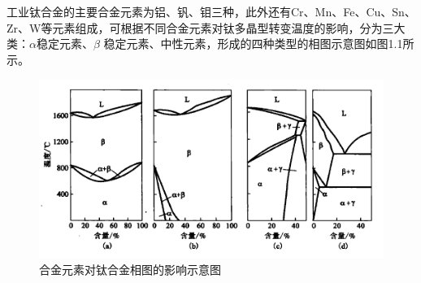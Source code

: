 工业钛合金的主要合金元素为铝、钒、钼三种，此外还有Cr、Mn、Fe、Cu、Sn、Zr、W等元素组成，可根据不同合金元素对钛多晶型转变温度的影响，分为三大类：$\alpha$稳定元素、$\beta$ 稳定元素、中性元素，形成的四种类型的相图示意图如图1.1所示。
\begin{figure}[h!]
	\centering
	\includegraphics[width=0.9\linewidth]{pic/01}
	\caption{合金元素对钛合金相图的影响示意图}
	\label{fig:01}
\end{figure}

